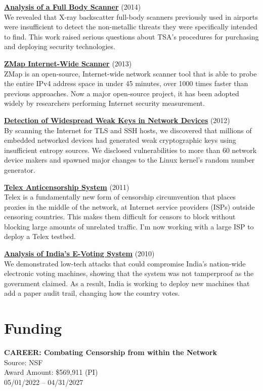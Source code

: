 \documentclass[margin,11pt]{res} %
\begin{document}
\textbf{\href{https://radsec.org}{Analysis of a Full Body Scanner}} (2014)\\
We revealed that X-ray backscatter full-body scanners previously used in airports were insufficient to detect the non-metallic threats they were specifically intended to find. This work raised serious questions about TSA's procedures for purchasing and deploying security technologies.

\textbf{\href{https://zmap.io/}{ZMap Internet-Wide Scanner}} (2013)\\
ZMap is an open-source, Internet-wide network scanner tool that is able to probe the entire IPv4 address space in under 45 minutes, over 1000 times faster than previous approaches. Now a major open-source project, it has been adopted widely by researchers performing Internet security measurement.

\textbf{\href{https://factorable.net/}{Detection of Widespread Weak Keys in Network Devices}} (2012)\\
By scanning the Internet for TLS and SSH hosts, we discovered that millions of embedded networked devices had generated weak cryptographic keys using insufficient entropy sources. We disclosed vulnerabilities to more than 60 network device makers and spawned major changes to the Linux kernel's random number generator.

\textbf{\href{https://telex.cc/}{Telex Anticensorship System}} (2011)\\
Telex is a fundamentally new form of censorship circumvention that places proxies in the middle of the network, at Internet service providers (ISPs) outside censoring countries.  This makes them difficult for censors to block without blocking large amounts of unrelated traffic. I'm now working with a large ISP to deploy a Telex testbed.

\textbf{\href{http://indiaevm.org/}{Analysis of India's E-Voting System}} (2010)\\
We demonstrated low-tech attacks that could compromise India's nation-wide electronic voting machines, showing that the system was not tamperproof as the government claimed.  As a result, India is working to deploy new machines that add a paper audit trail, changing how the country votes.

\section{\large Funding}


\textbf{CAREER: Combating Censorship from within the Network} \\
Source: NSF \\
Award Amount: \$569,911 (PI) \\
05/01/2022 -- 04/31/2027
\end{document}
